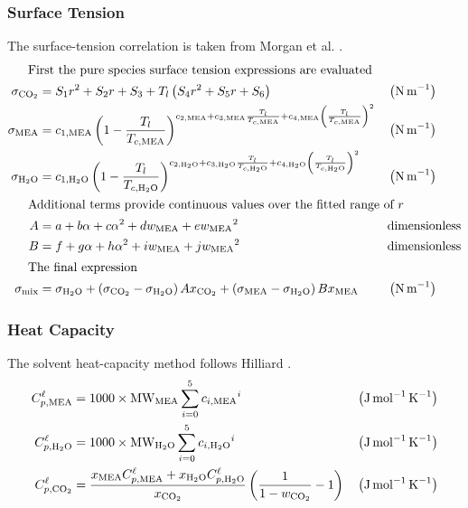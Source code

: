             \subsubsection{Surface Tension} 
            The surface-tension correlation is taken from Morgan et al. \cite{Morgan2015}.
                \begin{align}
                    \shortintertext{\quad\; First the pure species surface tension expressions are evaluated}
                    \sigma _{\COtwo} &= S_1 r^2+S_2 r+S_3+T_l \left(S_4 r^2+S_5 r+S_6\right)
                    && \left(\unit{N\,m^{-1}}\right)\\
                    \sigma _{\MEA} &= c_{1,\MEA} \left(1-\frac{T_l}{T_{c,\MEA}}\right)^{c_{2,\MEA}+c_{3,\MEA} \frac{T_l}{T_{c,\MEA}}+c_{4,\MEA} \left(\frac{T_l}{T_{c,\MEA}}\right)^2}
                    && \left(\unit{N\,m^{-1}}\right)\\
                    \sigma _{\HtwoO} &= c_{1,\HtwoO} \left(1-\frac{T_l}{T_{c,\HtwoO}}\right)^{c_{2,\HtwoO}+c_{3,\HtwoO} \frac{T_l}{T_{c,\HtwoO}}+c_{4,\HtwoO} \left(\frac{T_l}{T_{c,\HtwoO}}\right)^2}
                    && \left(\unit{N\,m^{-1}}\right)\\
                    \shortintertext{\quad\; Additional terms provide continuous values over the fitted range of $r$}
                    A &= a+b \alpha+c {\alpha}^2+d w_{\MEA}+e {w_{\MEA}}^2
                    && \text{dimensionless}\\
                    B &= f+g \alpha+h {\alpha}^2+i w_{\MEA}+j {w_{\MEA}}^2
                    && \text{dimensionless}\\
                    \shortintertext{\quad\; The final expression}
                    \sigma _{\text{mix}} &= \sigma_{\HtwoO}+\left(\sigma_{\COtwo}-\sigma_{\HtwoO}\right) A x_{\COtwo}+\left(\sigma_{\MEA}-\sigma_{\HtwoO}\right) B x_{\MEA}
                    && \left(\unit{N\,m^{-1}}\right)
                \end{align}

            \subsubsection{Heat Capacity} 
                The solvent heat-capacity method follows Hilliard \cite{Hilliard2008}.
                \begin{align}
                    C^{\liq}_{p,\MEA} &= 1000 \times \text{\text{MW}}_{\MEA} \sum_{i=0}^{5} {c_{i, \MEA}}^{i}
                    && \left(\unit{J\,mol^{-1}\,K^{-1}}\right)\\
                    C^{\liq}_{p,\HtwoO} &= 1000 \times \text{\text{MW}}_{\HtwoO} \sum_{i=0}^{5} {c_{i, \HtwoO}}^{i}
                    && \left(\unit{J\,mol^{-1}\,K^{-1}}\right)\\
                    C^{\liq}_{p,\COtwo} &= \frac{x_{\MEA} C^{\liq}_{p,\MEA} + x_{\HtwoO} C^{\liq}_{p,\HtwoO}}{x_{\COtwo}} \left( \frac{1}{1 - w_{\COtwo}} - 1\right)
                    && \left(\unit{J\,mol^{-1}\,K^{-1}}\right)
                \end{align}

